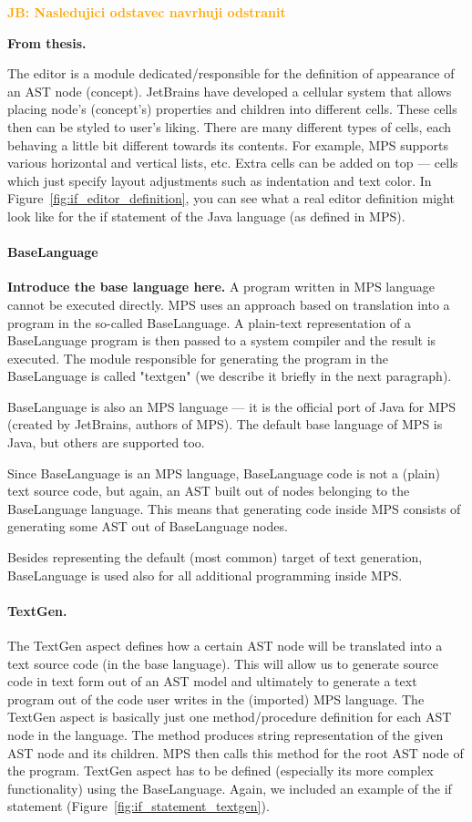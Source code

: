 \documentclass[10pt]{sigplanconf}
\newcommand{\todo}[1]{{\bfseries #1}}
\newcommand{\JB}[1]{\textcolor{orange}{\bfseries JB: #1}} %
\begin{document}
\JB{Nasledujici odstavec navrhuji odstranit}
\todo{From thesis.

The editor is a module dedicated/responsible for the definition of appearance of an AST node (concept).
JetBrains have developed a cellular system that allows placing node's (concept's) properties and children into different cells.
These cells then can be styled to user's liking.
There are many different types of cells, each behaving a little bit different towards its contents.
For example, MPS supports various horizontal and vertical lists, etc.
Extra cells can be added on top --- cells which just specify layout adjustments such as indentation and text color.
In Figure~\ref{fig:if_editor_definition}, you can see what a real editor definition might look like for the if statement of the Java language (as defined in MPS).
}

\paragraph{BaseLanguage}
\todo{Introduce the base language here.}
A program written in MPS language cannot be executed directly.
MPS uses an approach based on translation into a program in the so-called BaseLanguage.
A plain-text representation of a BaseLanguage program is then passed to a system compiler and the result is executed.
The module responsible for generating the program in the BaseLanguage is called "textgen" (we describe it briefly in the next paragraph).

BaseLanguage is also an MPS language --- it is the official port of Java for MPS (created by JetBrains, authors of MPS).
The default base language of MPS is Java, but others are supported too.

Since BaseLanguage is an MPS language, BaseLanguage code is not a (plain) text source code, but again, an AST built out of nodes belonging to the BaseLanguage language.
This means that generating code inside MPS consists of generating some AST out of BaseLanguage nodes.

Besides representing the default (most common) target of text generation, BaseLanguage is used also for all additional programming inside MPS.

\paragraph{TextGen.}
The TextGen aspect defines how a certain AST node will be translated into a text source code (in the base language).
This will allow us to generate source code in text form out of an AST model and ultimately to generate a text program out of the code user writes in the (imported) MPS language.
The TextGen aspect is basically just one method/procedure definition for each AST node in the language. The method produces string representation of the given AST node and its children.
MPS then calls this method for the root AST node of the program.
TextGen aspect has to be defined (especially its more complex functionality) using the BaseLanguage.
Again, we included an example of the if statement (Figure~\ref{fig:if_statement_textgen}).
\end{document}
